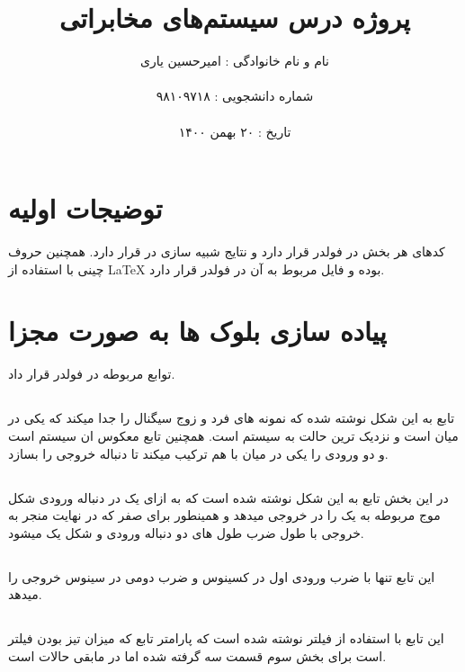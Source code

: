 \documentclass[10pt]{article}
\title{پروژه درس سیستم‌های مخابراتی}
\author{نام و نام‌ خانوادگی : امیرحسین یاری
	\\ \\
	شماره دانشجویی : ۹۸۱۰۹۷۱۸ 	\\ \\
	تاریخ : ۲۰ بهمن ۱۴۰۰}
\date{}
\begin{document}
	
	\maketitle
	\pagebreak
	\tableofcontents
	\newpage
	\section{توضیجات اولیه}
	کد‌های هر بخش در فولدر 
	قرار دارد و نتایج شبیه سازی در 
	قرار دارد.
	همچنین حروف چینی با استفاده از 
	\LaTeX
	بوده و فایل
	مربوط به آن در فولدر 
	قرار دارد.
	
	\section{پیاده سازی بلوک ها به صورت مجزا}
	توابع مربوطه در فولدر 
	قرار داد.
	\subsection{}
	تابع 
	به این شکل نوشته شده که نمونه های فرد و زوج سیگنال را جدا میکند که یکی در میان است و نزدیک ترین حالت به سیستم
	است.
	همچنین تابع
	معکوس ان سیستم است و دو ورودی را یکی در میان با هم ترکیب میکند تا دنباله خروجی را بسازد.
	
	
	\subsection{}
	در این بخش تابع 
	به این شکل نوشته شده است که به ازای یک در دنباله ورودی شکل موج مربوطه به یک را در خروجی میدهد و همینطور برای صفر که در نهایت منجر به خروجی با طول ضرب طول های دو دنباله ورودی و شکل یک میشود. 
	
	
	\subsection{}
	این تابع تنها با ضرب ورودی اول در کسینوس و ضرب دومی در سینوس خروجی
	را میدهد.
	
	\subsection{}
	این تابع با استفاده از فیلتر 
	نوشته شده است که پارامتر
	تابع که میزان تیز بودن فیلتر است برای بخش سوم قسمت سه
	گرفته شده اما در مابقی حالات
	است.
	
\end{document}
